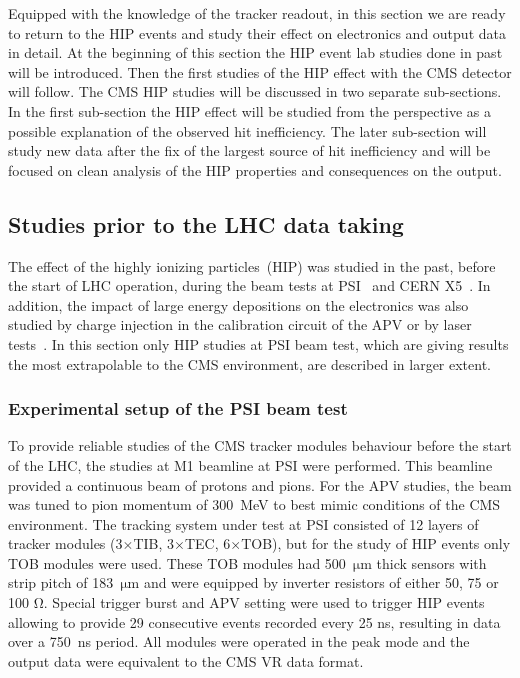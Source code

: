 Equipped with the knowledge of the tracker readout, in this section we are ready to return to the HIP events and study their effect on electronics and output data in detail. At the beginning of this section the HIP event lab studies done in past will be introduced. Then the first studies of the HIP effect with the CMS detector will follow. The CMS HIP studies will be discussed in two separate sub-sections. In the first sub-section the HIP effect will be studied from the perspective as a possible explanation of the observed hit inefficiency. The later sub-section will study new data after the fix of the largest source of hit inefficiency and will be focused on clean analysis of the HIP properties and consequences on the output.

\subsection{Studies prior to the LHC data taking~\label{sec:HIPinPast}}

The effect of the highly ionizing particles~(HIP) was studied in the past, before the start of LHC operation, during the beam tests at PSI~\cite{Tomalin:2003aaa} and CERN X5~\cite{Bainbridge:2002bda}. In addition, the impact of large energy depositions on the electronics was also studied by charge injection in the calibration circuit of the APV or by laser tests~\cite{Adam:2005pz}. In this section only HIP studies at PSI beam test, which are giving results the most extrapolable to the CMS environment, are described in larger extent.

\subsubsection{Experimental setup of the PSI beam test}

To provide reliable studies of the CMS tracker modules behaviour before the start of the LHC, the studies at M1 beamline at PSI were performed. This beamline provided a continuous beam of protons and pions. For the APV studies, the beam was tuned to pion momentum of 300~MeV to best mimic conditions of the CMS environment. The tracking system under test at PSI consisted of 12 layers of tracker modules (3$\times$TIB, 3$\times$TEC, 6$\times$TOB), but for the study of HIP events only TOB modules were used. These TOB modules had 500~$\mathrm{\mu m}$ thick sensors with strip pitch of 183~$\mathrm{\mu}$m and were equipped by inverter resistors of either 50, 75 or 100 $\mathrm{\Omega}$. Special trigger burst and APV setting were used to trigger HIP events allowing to provide 29 consecutive events recorded every 25 ns, resulting in data over a 750~ns period. All modules were operated in the peak mode and the output data were equivalent to the CMS VR data format. 


